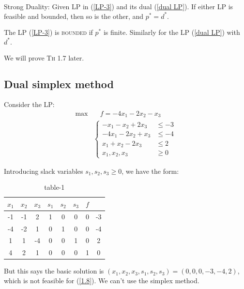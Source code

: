 \begin{theorem}
    Strong Duality: Given LP in (\ref{LP-3}) and its dual (\ref{dual LP}). If either LP is feasible and bounded, then so is the other, and $p^* = d^*$.
\end{theorem}

\begin{remark}
    The LP (\ref{LP-3}) is \textsc{bounded} if $p^*$ is finite. Similarly for the LP (\ref{dual LP}) with $d^*$.
\end{remark}

We will prove \textsc{Th} 1.7 later.

\subsection{Dual simplex method}
\begin{example}
    Consider the LP:
    \begin{align}
        \max & \quad f = -4x_1 - 2x_2 - x_3 \nonumber\\
        & \left\lbrace\begin{array}{ll}
            -x_1-x_2+2x_3 &\le  -3\\
            -4x_1-2x_2+x_3 &\le -4\\
            x_1+x_2-2x_3 &\le 2\\
            x_1,x_2, x_3 &\ge 0
        \end{array} \right.\label{1.8}
    \end{align}
    
    Introducing slack variables $s_1, s_2, s_3\ge 0$, we have the form:
    \begin{table}[H]
        \centering
        \begin{tabular}{ccccccc|c}
        \hline
         $x_1$ & $x_2$ & $x_3$ & $s_1$ & $s_2$ & $s_3$ & $f$ &  \\ \hline
        -1 & -1 & 2& 1 & 0 & 0& 0& -3 \\
        -4 & -2 & 1 & 0 & 1 & 0 & 0& -4\\
        1 & 1& -4 & 0 & 0 & 1 & 0 & 2\\ \hline
        4 & 2& 1 & 0& 0& 0 & 1& 0\\ \hline
        \end{tabular}
        \caption{table-1}
        \label{tab-1}
    \end{table}

    But this says the basic solution is $(x_1, x_2, x_3, s_1, s_2, s_3) = (0, 0, 0, -3, -4, 2)$, which is not feasible for (\ref{1.8}). We can't use the simplex method.


\end{example}
